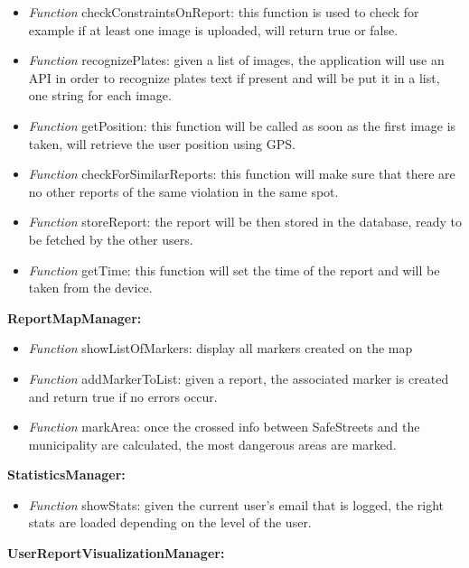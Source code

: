 \documentclass[../RASD.tex]{subfiles}
\begin{document}
    \begin{itemize}
        \item     \textit{Function} checkConstraintsOnReport: this function is used to check for example if at least one image is uploaded, will return true or false.
        \item     \textit{Function} recognizePlates: given a list of images, the application will use an API in order to recognize plates text
        if present and will be put it in a list, one string for each image.
        \item     \textit{Function} getPosition: this function will be called as soon as the first image is taken, will retrieve the user position using GPS.
        \item     \textit{Function} checkForSimilarReports: this function will make sure that there are no other reports of the same violation in the same spot.
        \item     \textit{Function} storeReport: the report will be then stored in the database, ready to be fetched by the other users.
        \item     \textit{Function} getTime: this function will set the time of the report and will be taken from the device.
    \end{itemize}
    \textbf{ReportMapManager:}
    \begin{itemize}
        \item     \textit{Function} showListOfMarkers: display all markers created on the map
        \item     \textit{Function} addMarkerToList: given a report, the associated marker is created and return true if no errors occur.
        \item     \textit{Function} markArea: once the crossed info between SafeStreets and the municipality are calculated, the most dangerous areas are marked.
    \end{itemize}
    \textbf{StatisticsManager:}
    \begin{itemize}
        \item     \textit{Function} showStats: given the current user’s email that is logged, the right stats are loaded depending on the level of the user.
    \end{itemize}
    \textbf{UserReportVisualizationManager:}
\end{document}
